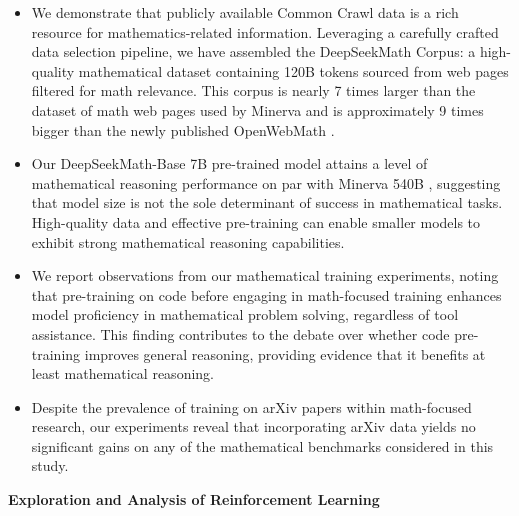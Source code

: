 \begin{itemize}[topsep=0pt]
    \item We demonstrate that publicly available Common Crawl data is a rich resource for mathematics-related information. Leveraging a carefully crafted data selection pipeline, we have assembled the DeepSeekMath Corpus: a high-quality mathematical dataset containing 120B tokens sourced from web pages filtered for math relevance. This corpus is nearly 7 times larger than the dataset of math web pages used by Minerva \citep{minerva} and is approximately 9 times bigger than the newly published OpenWebMath \citep{openwebmath}.

    \item Our DeepSeekMath-Base 7B pre-trained model attains a level of mathematical reasoning performance on par with Minerva 540B \citep{minerva}, suggesting that model size is not the sole determinant of success in mathematical tasks. High-quality data and effective pre-training can enable smaller models to exhibit strong mathematical reasoning capabilities.

    \item We report observations from our mathematical training experiments, noting that pre-training on code before engaging in math-focused training enhances model proficiency in mathematical problem solving, regardless of tool assistance. This finding contributes to the debate over whether code pre-training improves general reasoning, providing evidence that it benefits at least mathematical reasoning.

    \item Despite the prevalence of training on arXiv papers within math-focused research, our experiments reveal that incorporating arXiv data yields no significant gains on any of the mathematical benchmarks considered in this study.
\end{itemize}

\textbf{Exploration and Analysis of Reinforcement Learning}

